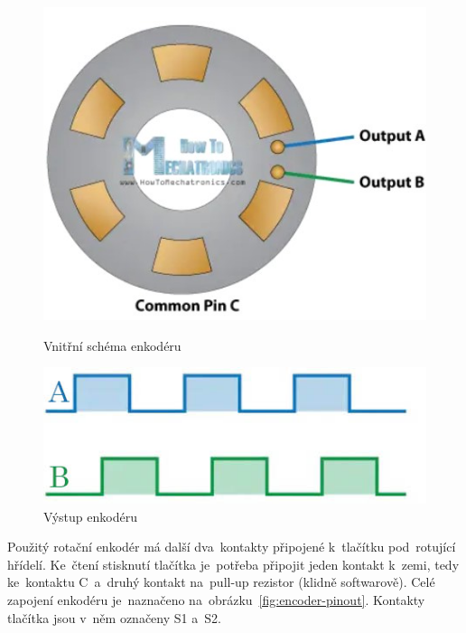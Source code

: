 \begin{figure}[htb]
  \centering
  \begin{minipage}{0.45\textwidth}
    \centering
    \includegraphics[width=1\textwidth]{img/encoder-working.jpg}
    \caption{\label{fig:encoder-working} Vnitřní schéma enkodéru~\cite{how-encoders-work}}
  \end{minipage}\hfill
  \begin{minipage}{0.45\textwidth}
    \centering
    \includegraphics[width=1\textwidth]{img/encoder-graph.jpg}
    \caption{\label{fig:encoder-graph} Výstup enkodéru~\cite{how-encoders-work}}
  \end{minipage}
\end{figure}

Použitý rotační enkodér má další dva~kontakty připojené k~tlačítku pod~rotující hřídelí.
Ke~čtení stisknutí tlačítka je~potřeba připojit jeden kontakt k~zemi, tedy ke~kontaktu C~a~druhý kontakt na~pull-up rezistor (klidně softwarově).
Celé zapojení enkodéru je~naznačeno na~obrázku~\ref{fig:encoder-pinout}. Kontakty tlačítka jsou v~něm označeny S1 a~S2.

